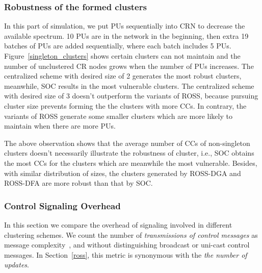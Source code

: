 \documentclass[times]{ettauth}
\newcommand{\ie}{i.e., }
\theoremstyle{mytheoremstyle}
\theoremstyle{mytheoremstyle}
\theoremstyle{mytheoremstyle}
\begin{document}
\subsubsection{Robustness of the formed clusters}
In this part of simulation, we put PUs sequentially into CRN to decrease the available spectrum.
10 PUs are in the network in the beginning, then extra 19 batches of PUs are added sequentially, where each batch includes 5 PUs. 
%
Figure~\ref{singleton_clusters} shows certain clusters can not maintain and the number of unclustered CR nodes grows when the number of PUs increases.
The centralized scheme with desired size of 2 generates the most robust clusters, meanwhile, SOC results in the most vulnerable clusters.
The centralized scheme with desired size of 3 doesn't outperform the variants of ROSS, because pursuing cluster size prevents forming the the clusters with more CCs.
In contrary, the variants of ROSS generate some smaller clusters which are more likely to maintain when there are more PUs.

The above observation shows that the average number of CCs of non-singleton clusters doesn't necessarily illustrate the robustness  of cluster, \ie SOC obtains the most CCs for the clusters which are meanwhile the most vulnerable.
Besides, with similar distribution of sizes, the clusters generated by ROSS-DGA and ROSS-DFA are more robust than that by SOC.


\subsubsection{Control Signaling Overhead}

In this section we compare the overhead of signaling involved in different clustering schemes.
We count the number of \textit{transmissions of control messages} as message complexity~\cite{complexity_aggregation_2011}, and without distinguishing broadcast or uni-cast control messages.
In Section~\ref{ross}, this metric is synonymous with the \textit{the number of updates}.
\end{document}
